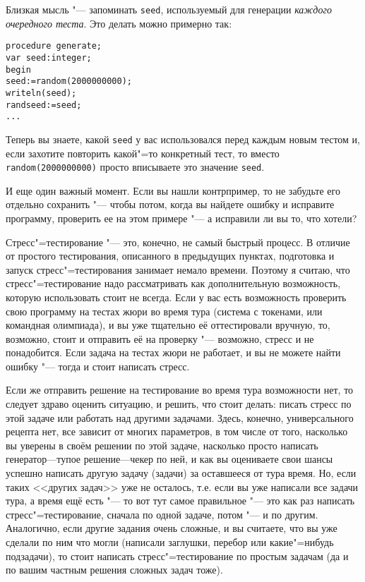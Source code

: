 Близкая мысль "--- запоминать \verb`seed`, используемый для генерации \textit{каждого очередного теста}. Это делать можно примерно так:
\begin{verbatim}
procedure generate;
var seed:integer;
begin
seed:=random(2000000000);
writeln(seed);
randseed:=seed;
...
\end{verbatim}
Теперь вы знаете, какой \verb`seed` у вас использовался перед каждым новым тестом и, если захотите повторить какой"=то конкретный тест, то 
вместо \verb`random(2000000000)` просто вписываете это значение \verb`seed`.

И еще один важный момент. Если вы нашли контрпример, то не забудьте его отдельно сохранить "--- чтобы потом, когда вы найдете ошибку и исправите
программу, проверить ее на этом примере "--- а исправили ли вы то, что хотели?

Стресс"=тестирование "--- это, конечно, не самый быстрый процесс. 
В отличие от простого тестирования, описанного в предыдущих пунктах, подготовка и запуск стресс"=тестирования занимает немало времени.
Поэтому я считаю, что стресс"=тестирование надо рассматривать как дополнительную возможность, которую использовать стоит не всегда.
Если у вас есть возможность проверить свою программу на тестах жюри во время тура (система с токенами, или командная олимпиада), 
и вы уже тщательно её оттестировали вручную, то, возможно, стоит и отправить её на проверку "--- возможно, стресс и не понадобится.
Если задача на тестах жюри не работает, и вы не можете найти ошибку "--- тогда и стоит написать стресс.

Если же отправить решение на тестирование во время тура возможности нет, то следует здраво оценить ситуацию, и решить, что стоит делать:
писать стресс по этой задаче или работать над другими задачами. 
Здесь, конечно, универсального рецепта нет, все зависит от многих параметров, 
в том числе от того, насколько вы уверены в своём решении по этой задаче, насколько просто написать генератор---тупое решение---чекер по ней,
и как вы оцениваете свои шансы успешно написать другую задачу (задачи) за оставшееся от тура время. 
Но, если таких <<других задач>> уже не осталось, т.е. если вы уже написали все задачи тура, а время ещё есть "--- то вот тут самое правильное "---
это как раз написать стресс"=тестирование, сначала по одной задаче, потом "--- и по другим. 
Аналогично, если другие задания очень сложные, и вы считаете, что вы уже сделали по ним что могли (написали заглушки, перебор или какие"=нибудь подзадачи),
то стоит написать стресс"=тестирование по простым задачам (да и по вашим частным решения сложных задач тоже).

